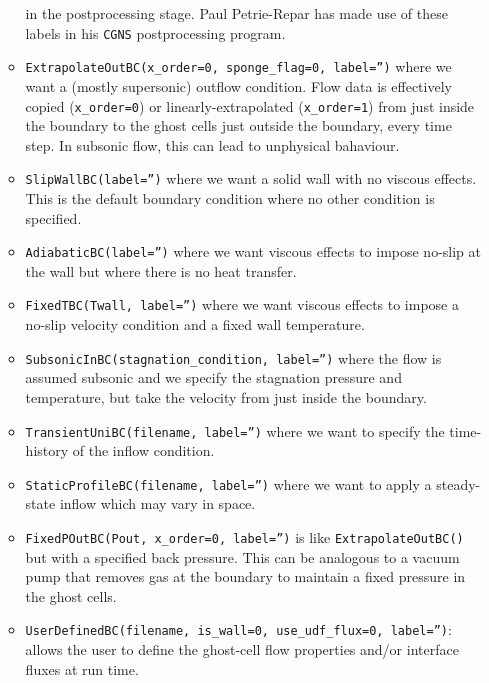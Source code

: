 \begin{itemize}
\begin{itemize}
      in the postprocessing stage.
      Paul Petrie-Repar has made use of these labels in his \texttt{CGNS} postprocessing program.
    \item \texttt{ExtrapolateOutBC(x\_order=0, sponge\_flag=0, label='')} where we want a (mostly supersonic) outflow
      condition.
      Flow data is effectively copied (\texttt{x\_order=0}) or linearly-extrapolated (\texttt{x\_order=1})
      from just inside the boundary to the ghost cells just outside the boundary, every time step.
      In subsonic flow, this can lead to unphysical bahaviour.
    \item \texttt{SlipWallBC(label='')} where we want a solid wall with no viscous effects.
      This is the default boundary condition where no other condition is specified.
    \item \texttt{AdiabaticBC(label='')} where we want viscous effects to impose no-slip at the wall
      but where there is no heat transfer.
    \item \texttt{FixedTBC(Twall, label='')} where we want viscous effects to impose a no-slip velocity 
      condition and a fixed wall temperature.
    \item \texttt{SubsonicInBC(stagnation\_condition, label='')} where the flow is assumed subsonic and
      we specify the stagnation pressure and temperature, but take the velocity from just inside
      the boundary.
    \item \texttt{TransientUniBC(filename, label='')} where we want to specify the time-history of
      the inflow condition.
    \item \texttt{StaticProfileBC(filename, label='')} where we want to apply a steady-state inflow
       which may vary in space.
    \item \texttt{FixedPOutBC(Pout, x\_order=0, label='')} 
      is like \texttt{ExtrapolateOutBC()} but with a specified back pressure.
      This can be analogous to a vacuum pump that removes gas at the boundary to maintain
      a fixed pressure in the ghost cells.
    \item \texttt{UserDefinedBC(filename, is\_wall=0, use\_udf\_flux=0, label='')}: 
       allows the user to define the ghost-cell flow properties and/or interface fluxes at run time.

\end{itemize}
\end{itemize}
